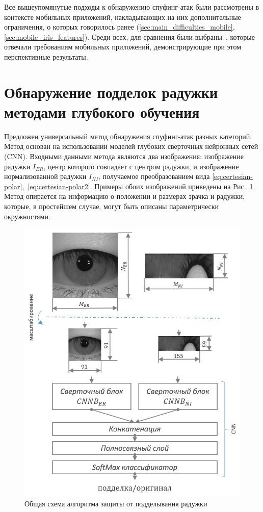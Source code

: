 Все вышеупомянутые подходы к обнаружению спуфинг-атак были рассмотрены в контексте мобильных приложений, накладывающих на них дополнительные ограничения, о которых говорилось ранее (\ref{sec:main_difficulties_mobile}, \ref{sec:mobile_iris_features}). Среди всех, для сравнения были выбраны~\cite{sequeira_2014,sequeira_2014_2,raghavendra_2015}, которые отвечали требованиям мобильных приложений, демонстрирующие при этом перспективные результаты.

\section{Обнаружение подделок радужки методами глубокого обучения}
\label{sec:proposed-anti-spoofing}

Предложен универсальный метод обнаружения спуфинг-атак разных категорий. Метод основан на использовании моделей глубоких сверточных нейронных сетей (CNN). Входными данными метода являются два изображения: изображение радужки $I_{ER}$, центр которого совпадает с центром радужки, и изображение нормализованной радужки $I_{NI}$, получаемое преобразованием вида \ref{eq:certesian-polar},~\ref{eq:certesian-polar2}. Примеры обоих изображений приведены на Рис.~\ref{fig:anti-spoofing-arch-scheme}. Метод опирается на информацию о положении и размерах зрачка и радужки, которые, в простейшем случае, могут быть описаны параметрически окружностями.

\begin{figure}[t!]
	\centering
	\includegraphics[width=0.75\columnwidth]{pictures/anti-spoofing-arch-scheme.png}
	\caption{Общая схема алгоритма защиты от подделывания радужки}
	\label{fig:anti-spoofing-arch-scheme}
\end{figure}

